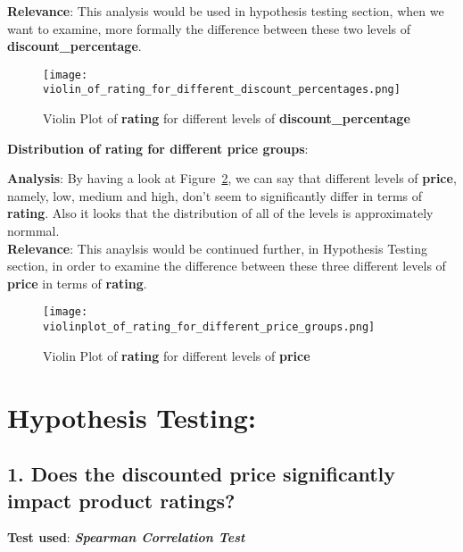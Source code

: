 \documentclass[a4paper,12pt]{article}
\begin{document}
\noindent\textbf{Relevance}: This analysis would be used in hypothesis testing section, when we want to examine, more formally the difference between these two levels of \textbf{discount\_percentage}. \\

\begin{figure}[H]
    \centering
    \texttt{[image: violin\_of\_rating\_for\_different\_discount\_percentages.png]} %
    \caption{Violin Plot of \textbf{rating} for different levels of \textbf{discount\_percentage}}
    \label{fig:Figure_6}
\end{figure}

\noindent\textbf{Distribution of rating for different price groups}:

\noindent\textbf{Analysis}: By having a look at Figure~\ref{fig:Figure_7}, we can say that different levels of \textbf{price}, namely, low, medium and high, don't seem to significantly differ in terms of \textbf{rating}. Also it looks that the distribution of all of the levels is approximately normmal. \\ 

\noindent\textbf{Relevance}: This anaylsis would be continued further, in Hypothesis Testing section, in order to examine the difference between these  three different levels of \textbf{price} in terms of \textbf{rating}. \\

\begin{figure}[H]
    \centering
    \texttt{[image: violinplot\_of\_rating\_for\_different\_price\_groups.png]} %
    \caption{Violin Plot of \textbf{rating} for different levels of \textbf{price}}
    \label{fig:Figure_7}
\end{figure}


\section*{Hypothesis Testing:}

\subsection*{1. Does the \textbf{discounted price} significantly impact product \textbf{ratings?}}

\noindent\textbf{Test used}: \textit{\textbf{Spearman Correlation Test}} \\ 
\end{document}
